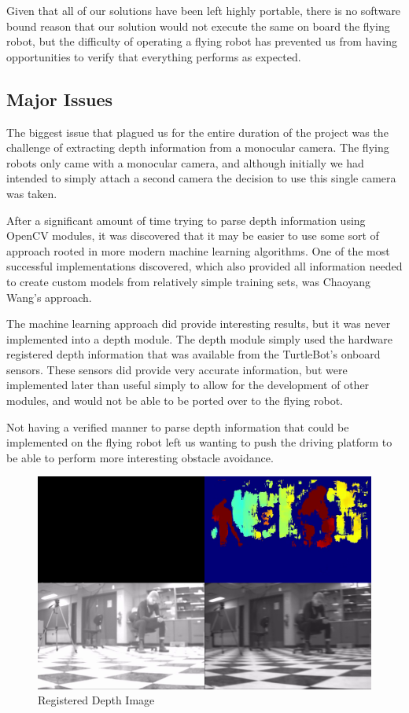 \documentclass{article}[12]
\begin{document}
Given that all of our solutions have been left highly portable, there is no software bound reason that our solution would not execute the same on board the flying robot, but the difficulty of operating a flying robot has prevented us from having opportunities to verify that everything performs as expected.

\subsection{Major Issues}

The biggest issue that plagued us for the entire duration of the project was the challenge of extracting depth information from a monocular camera. The flying robots only came with a monocular camera, and although initially we had intended to simply attach a second camera the decision to use this single camera was taken.

After a significant amount of time trying to parse depth information using OpenCV modules, it was discovered that it may be easier to use some sort of approach rooted in more modern machine learning algorithms. One of the most successful implementations discovered, which also provided all information needed to create custom models from relatively simple training sets, was Chaoyang Wang's approach.\cite{Wang_2018_CVPR} 

The machine learning approach did provide interesting results, but it was never implemented into a depth module. The depth module simply used the hardware registered depth information that was available from the TurtleBot's onboard sensors. These sensors did provide very accurate information, but were implemented later than useful simply to allow for the development of other modules, and would not be able to be ported over to the flying robot. 

Not having a verified manner to parse depth information that could be implemented on the flying robot left us wanting to push the driving platform to be able to perform more interesting obstacle avoidance.

\begin{figure}[H]
	\centering
	\includegraphics[width=0.6\linewidth]{stereo}
	\caption{Registered Depth Image}
	\label{fig:stereostereo}
\end{figure}
\end{document}
